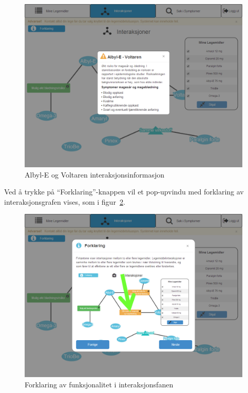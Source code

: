 \begin{figure}[H]
    \centering
    \includegraphics[width=1\textwidth]{fig/utviklingAvPrototype/albyl-eVoltarenInteraksjon.PNG}
    \caption{Albyl-E og Voltaren interaksjonsinformasjon}
    \label{fig:albyl-eVoltarenInteraksjon}
\end{figure} 


Ved å trykke på “Forklaring”-knappen vil et pop-upvindu med forklaring av interaksjonsgrafen vises, som i figur~\ref{fig:forklaring}.

\begin{figure}[H]
    \centering
    \includegraphics[width=1\textwidth]{fig/utviklingAvPrototype/Forklaring.PNG}
    \caption{Forklaring av funksjonalitet i interaksjonsfanen}
    \label{fig:forklaring}
\end{figure} 

